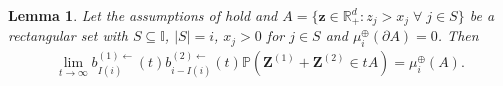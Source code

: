 \documentclass[aos]{imsart}
\numberwithin{equation}{section}
\theoremstyle{plain} %
\newtheorem{lemma}[theorem]{Lemma}
\theoremstyle{remark}
\newcommand{\beam}{\begin{eqnarray}}
\newcommand{\eeam}{\end{eqnarray}\noindent}
\newcommand{\E}{\mathbb{E}}
\renewcommand\P{\mathbb{P}}
\newcommand{\R}{\mathbb{R}}
\def\MRV{\mathcal{MRV}}
\def\bZ{\boldsymbol Z}
\def\bz{\boldsymbol z}
\begin{document}
\begin{lemma} \label{Lemma 3.4}
Let the assumptions of  hold and
%
 $A= \{\bz \in \R_+^d: z_j>x_j \;\forall\; j\in S\}$ be a rectangular set with
 $S\subseteq \mathbb{I}$, $|S|= i$, $x_{j}>0$ for $j\in S$ and $\mu_i^{\oplus}(\partial A)=0$. Then
\beam\label{eq:lemma2}
   \lim_{t\to\infty}b_{I(i)}^{(1)\leftarrow}(t)b_{i-I(i)}^{(2)\leftarrow}(t) \P\left(\bZ^{(1)}+\bZ^{(2)}\in tA\right)
        =\mu_i^{\oplus}(A).
\eeam
\end{lemma}
\end{document}
